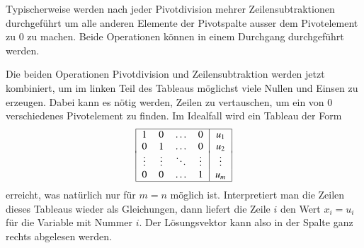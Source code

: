 Typischerweise werden nach jeder Pivotdivision mehrer Zeilensubtraktionen
durchgeführt um alle anderen Elemente der Pivotspalte ausser dem
Pivotelement zu $0$ zu machen.
Beide Operationen können in einem Durchgang durchgeführt werden.

Die beiden Operationen Pivotdivision und Zeilensubtraktion werden jetzt
kombiniert, um im linken Teil des Tableaus möglichst viele Nullen und
Einsen zu erzeugen.
Dabei kann es nötig werden, Zeilen zu vertauschen, um ein von $0$
verschiedenes Pivotelement zu finden.
Im Idealfall wird ein Tableau der Form
\[
\begin{tabular}{|>{$}c<{$}>{$}c<{$}>{$}c<{$}>{$}c<{$}|>{$}c<{$}|}
\hline
     1&     0&\dots &     0&u_1   \\
     0&     1&\dots &     0&u_2   \\[-2pt]
\vdots&\vdots&\ddots&\vdots&\vdots\\
     0&     0&\dots &     1&u_m   \\
\hline
\end{tabular}
\]
erreicht, was natürlich nur für $m=n$ möglich ist.
Interpretiert man die Zeilen dieses Tableaus wieder als Gleichungen,
dann liefert die Zeile $i$ den Wert $x_i=u_i$ für die Variable
mit Nummer $i$.
Der Lösungsvektor kann also in der Spalte ganz rechts abgelesen werden.

